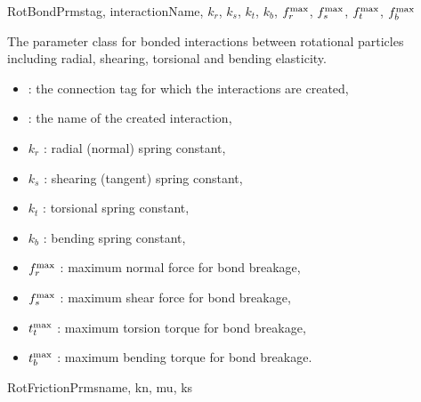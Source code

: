 \documentclass{manual}
\begin{document}
\newcommand{\brkForce}[1]{f^{\rm max}_{#1}}
\newcommand{\brkTorque}[1]{t^{\rm max}_{#1}}
\begin{classdesc}{RotBondPrms}{tag, interactionName, $k_r$, $k_s$, $k_t$, $k_b$, $\brkForce{r}$, $\brkForce{s}$, $\brkForce{t}$, $\brkForce{b}$}

The parameter class for bonded interactions between rotational particles including radial, shearing, torsional and bending elasticity. 
\begin{itemize}
\item {} : the connection tag for which the interactions are created,
\item {} : the name of the created interaction,
\item{$k_r$} : radial (normal) spring constant,
\item{$k_s$} : shearing (tangent) spring constant,
\item{$k_t$} : torsional spring constant,
\item{$k_b$} : bending spring constant,
\item{$\brkForce{r}$} : maximum normal force for bond breakage,
\item{$\brkForce{s}$} : maximum shear force for bond breakage,
\item{$\brkTorque{t}$} : maximum torsion torque for bond breakage,
\item{$\brkTorque{b}$} : maximum bending torque for bond breakage.
\end{itemize}
\end{classdesc}

\begin{classdesc}{RotFrictionPrms}{name, kn, mu, ks}
\end{classdesc}
\end{document}
